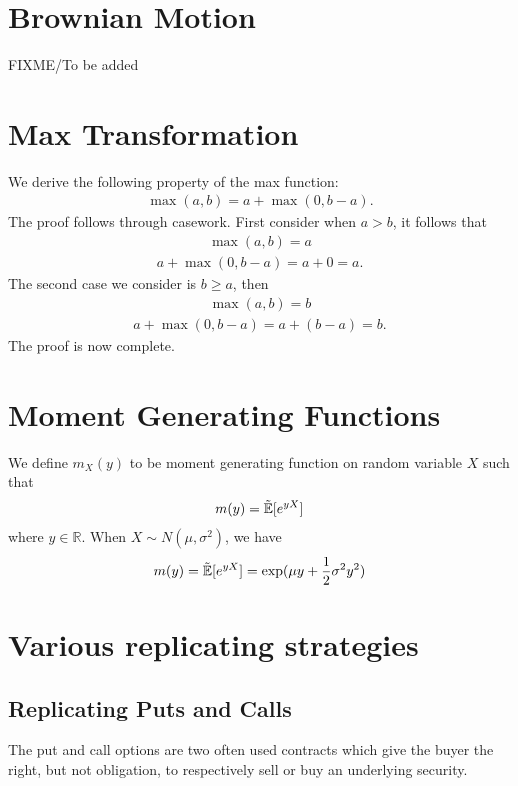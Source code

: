 \documentclass[reqno]{amsart}
\newcommand{\rE}[1]{\tilde{\E}[#1]}
\begin{document}
\section{Brownian Motion}\label{BM Appendix}
FIXME/To be added

\section{Max Transformation}
We derive the following property of the max function:
\begin{align}
     \max(a, b) = a + \max(0, b-a).
\end{align}
The proof follows through casework. First consider when $a > b$, it follows that
\begin{align}
     \max(a, b) = a
\end{align}
\begin{align}
     a + \max(0, b-a) = a + 0 = a.
\end{align}
The second case we consider is $b \geq a$, then
\begin{align}
     \max(a, b) = b
\end{align}
\begin{align}
     a + \max(0, b-a) = a + (b - a) = b.
\end{align}
The proof is now complete.

\section{Moment Generating Functions}

We define $m_X(y)$ to be moment generating function on random variable $X$ such that 
\begin{align}
     m(y) = \rE{e^{yX}}
\end{align}
where $y \in \mathbb{R}$. When $X \sim N(\mu, \sigma^2)$, we have 
\begin{align} \label{mgf func}
     m(y) = \rE{e^{yX}} = \exp(\mu y + \frac{1}{2} \sigma^2 y^2)
\end{align}
\section{Various replicating strategies}

\subsection{Replicating Puts and Calls}

The put and call options are two often used contracts which give the buyer the right, but not obligation, to respectively sell or buy an underlying security. 
\end{document}
